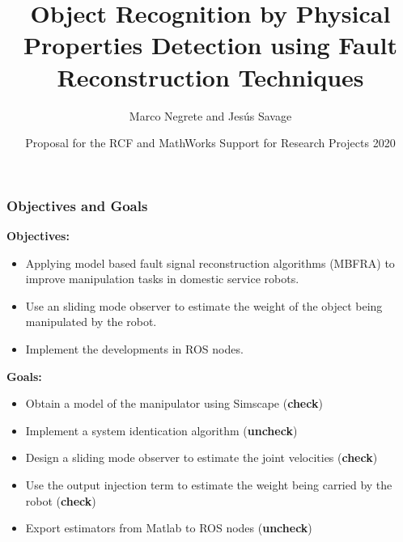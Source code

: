 \documentclass[9pt,spanish,aspectratio=1610]{beamer}
\begin{document}
\renewcommand{\tablename}{Tabla}
\renewcommand{\figurename}{Figura}

\title[Object Recognition using Fault Reconstruction Techniques]{Object Recognition by Physical Properties Detection using Fault Reconstruction Techniques}
\author[Marco Negrete and Jesús Savage]{Marco Negrete and Jesús Savage}
\date[RFC-MathWorks Support for Research Projects 2020]{Proposal for the RCF and MathWorks Support for Research Projects 2020}

\begin{frame}
\titlepage
\end{frame}

\begin{frame}\frametitle{Objectives and Goals}
  \textbf{Objectives:}
  \begin{itemize}
  \item Applying model based fault signal reconstruction algorithms (MBFRA) to improve manipulation tasks in domestic service robots.
  \item Use an sliding mode observer to estimate the weight of the object being manipulated by the robot.
  \item Implement the developments in ROS nodes.
  \end{itemize}

  \textbf{Goals:}
  \begin{itemize}
  \item Obtain a model of the manipulator using Simscape (\textbf{check})
  \item Implement a system identication algorithm  (\textbf{uncheck})
  \item Design a sliding mode observer to estimate the joint velocities (\textbf{check})
  \item Use the output injection term to estimate the weight being carried by the robot (\textbf{check})
  \item Export estimators from Matlab to ROS nodes (\textbf{uncheck})
  \end{itemize}
\end{frame}
\end{document}
